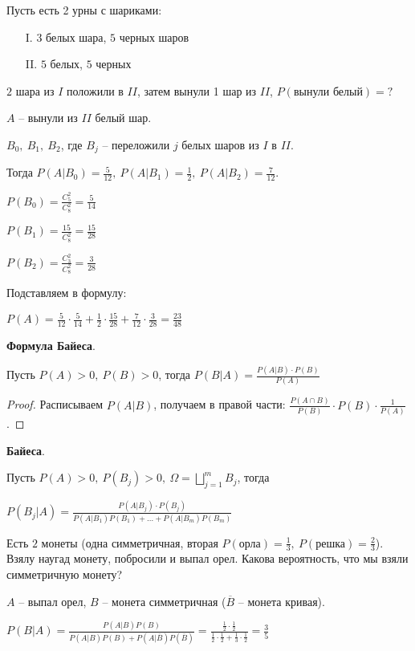 \begin{example}

    Пусть есть 2 урны с шариками:

    \begin{enumerate}
        \item[I.] $3$ белых шара, $5$ черных шаров
        \item[II.] $5$ белых, $5$ черных
    \end{enumerate}

    $2$ шара из $I$ положили в $II$, затем вынули 1 шар из $II$, $P(\text{вынули белый}) = ?$

    $A$ -- вынули из $II$ белый шар.

    $B_0, \ B_1, \ B_2$, где $B_j$ -- переложили $j$ белых шаров из $I$ в $II$.

    Тогда $P(A | B_0) = \frac{5}{12}, \ P(A | B_1) = \frac{1}{2}, \ P(A | B_2) = \frac{7}{12}$.

    $P(B_0) = \frac{C_5^2}{C_8^2} = \frac{5}{14}$

    $P(B_1) = \frac{15}{C_8^2} = \frac{15}{28}$

    $P(B_2) = \frac{C_3^2}{C_8^2} = \frac{3}{28}$

    Подставляем в формулу:

    $P(A) = \frac{5}{12} \cdot \frac{5}{14} + \frac{1}{2}\cdot \frac{15}{28} + \frac{7}{12}\cdot \frac{3}{28} = \frac{23}{48}$
\end{example}

\begin{theorem}
    \textbf{Формула Байеса}.

    Пусть $P(A) > 0, \ P(B) > 0$, тогда $P(B | A) = \frac{P(A | B) \cdot P(B)}{P(A)}$
\end{theorem}
\begin{proof}
    Расписываем $P(A | B)$, получаем в правой части: $\frac{P(A \cap B)}{P(B)} \cdot P(B) \cdot \frac{1}{P(A)}$.
\end{proof}

\begin{theorem}
    \textbf{Байеса}.

    Пусть $P(A) > 0, \ P(B_j) > 0, \ \Omega = \bigsqcup_{j=1}^{m} B_j$, тогда

    $P(B_j | A) = \frac{P(A | B_j) \cdot P(B_j)}{P(A|B_1) P(B_1) + \dots + P(A|B_m) P(B_m)}$
\end{theorem}

\begin{example}
    Есть $2$ монеты (одна симметричная, вторая $P(\text{орла}) = \frac{1}{3}, \ P(\text{решка}) = \frac{2}{3}$). Взялу наугад монету, побросили и выпал орел. Какова вероятность, что мы взяли симметричную монету?

    $A$ -- выпал орел, $B$ -- монета симметричная ($\overline{B}$ -- монета кривая).

    $P(B | A) = \frac{P(A | B) P(B)}{P(A|B) P(B) + P(A | \overline{B}) P(\overline{B})} = \frac{\frac{1}{2} \cdot \frac{1}{2}}{\frac{1}{2} \cdot \frac{1}{2} + \frac{1}{3} \cdot \frac{1}{2}} = \frac{3}{5}$
\end{example}



